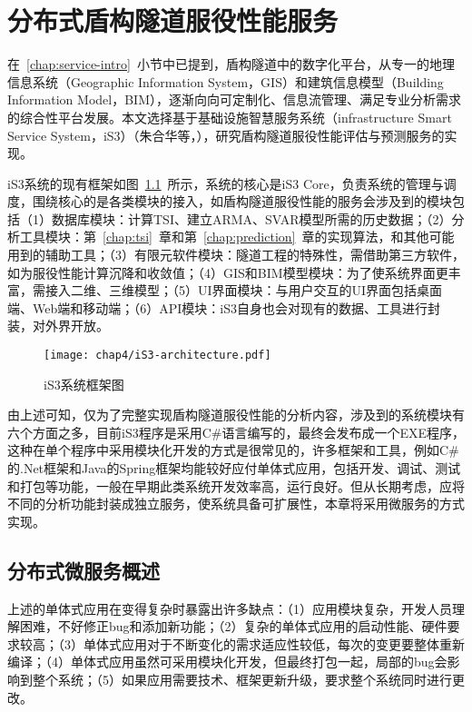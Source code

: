 \chapter{分布式盾构隧道服役性能服务}
\label{chap:service}

在~\ref{chap:service-intro}~小节中已提到，盾构隧道中的数字化平台，从专一的地理信息系统（Geographic Information System，GIS）和建筑信息模型（Building Information Model，BIM），逐渐向向可定制化、信息流管理、满足专业分析需求的综合性平台发展。本文选择基于基础设施智慧服务系统（infrastructure Smart Service System，iS3）（朱合华等，\citeyear{朱合华2018智慧基础设施}），研究盾构隧道服役性能评估与预测服务的实现。

iS3系统的现有框架如图~\ref{fig:iS3系统框架图}~所示，系统的核心是iS3 Core，负责系统的管理与调度，围绕核心的是各类模块的接入，如盾构隧道服役性能的服务会涉及到的模块包括（1）数据库模块：计算TSI、建立ARMA、SVAR模型所需的历史数据；（2）分析工具模块：第~\ref{chap:tsi}~章和第~\ref{chap:prediction}~章的实现算法，和其他可能用到的辅助工具；（3）有限元软件模块：隧道工程的特殊性，需借助第三方软件，如为服役性能计算沉降和收敛值；（4）GIS和BIM模型模块：为了使系统界面更丰富，需接入二维、三维模型；（5）UI界面模块：与用户交互的UI界面包括桌面端、Web端和移动端；（6）API模块：iS3自身也会对现有的数据、工具进行封装，对外界开放。

\begin{figure}[htb!]
    \centering
    \texttt{[image: chap4/iS3-architecture.pdf]}
    \caption{iS3系统框架图}
    \label{fig:iS3系统框架图}
\end{figure}

由上述可知，仅为了完整实现盾构隧道服役性能的分析内容，涉及到的系统模块有六个方面之多，目前iS3程序是采用C\#语言编写的，最终会发布成一个EXE程序，这种在单个程序中采用模块化开发的方式是很常见的，许多框架和工具，例如C\#的.Net框架和Java的Spring框架均能较好应付单体式应用，包括开发、调试、测试和打包等功能，一般在早期此类系统开发效率高，运行良好。但从长期考虑，应将不同的分析功能封装成独立服务，使系统具备可扩展性，本章将采用微服务的方式实现。

\section{分布式微服务概述}

上述的单体式应用在变得复杂时暴露出许多缺点：（1）应用模块复杂，开发人员理解困难，不好修正bug和添加新功能；（2）复杂的单体式应用的启动性能、硬件要求较高；（3）单体式应用对于不断变化的需求适应性较低，每次的变更要整体重新编译；（4）单体式应用虽然可采用模块化开发，但最终打包一起，局部的bug会影响到整个系统；（5）如果应用需要技术、框架更新升级，要求整个系统同时进行更改。

